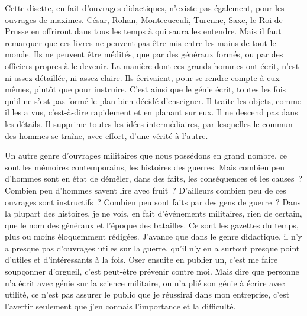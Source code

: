 \documentclass[french,twoside]{book} %
\begin{document}
Cette disette, en fait d’ouvrages didactiques, n’existe pas également, pour les ouvrages de maximes. César, Rohan, Montecucculi, Turenne, Saxe, le Roi de Prusse en offriront dans tous les temps à qui saura les entendre. Mais il faut remarquer que ces livres ne peuvent pas être mis entre les mains de tout le monde. Ils ne peuvent être médités, que par des généraux formés, ou par des officiers propres à le devenir. La manière dont ces grands hommes ont écrit, n’est ni assez détaillée, ni assez claire. Ils écrivaient, pour se rendre compte à eux-mêmes, plutôt que pour instruire. C’est ainsi que le génie écrit, toutes les fois qu’il ne s’est pas formé le plan bien décidé d’enseigner. Il traite les objets, comme il les a vus, c’est-à-dire rapidement et en planant sur eux. Il ne descend pas dans les détails. Il supprime toutes les idées intermédiaires, par lesquelles le commun des hommes se traîne, avec effort, d’une vérité à l’autre.\par
Un autre genre d’ouvrages militaires que nous possédons en grand nombre, ce sont les mémoires contemporains, les histoires des guerres. Mais combien peu d’hommes sont en état de démêler, dans des faits, les conséquences et les causes ? Combien peu d’hommes savent lire avec fruit ? D’ailleurs combien peu de ces ouvrages sont instructifs ? Combien peu sont faits par des gens de guerre ? Dans la plupart des histoires, je ne vois, en fait d’événements militaires, rien de certain, que le nom des généraux et l’époque des batailles. Ce sont les gazettes du temps, plus ou moins éloquemment rédigées. J’avance que dans le genre didactique, il n’y a presque pas d’ouvrages utiles sur la guerre, qu’il n’y en a surtout presque point d’utiles et d’intéressants à la fois. Oser ensuite en publier un, c’est me faire soupçonner d’orgueil, c’est peut-être prévenir contre moi. Mais dire que personne n’a écrit avec génie sur la science militaire, ou n’a plié son génie à écrire avec utilité, ce n’est pas assurer le public que je réussirai dans mon entreprise, c’est l’avertir seulement que j’en connais l’importance et la difficulté.
\end{document}
